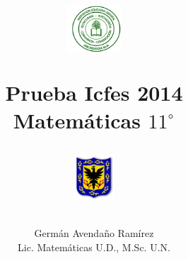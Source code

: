 \documentclass[10pt,addpoints]{exam}
\begin{document}
\title{\begin{minipage}{.2\textwidth}
        \includegraphics[height=1.75cm]{Images/logo-colegio.png}
       \end{minipage}
\begin{minipage}{.55\textwidth}
 \begin{center}
Prueba Icfes 2014\\Matemáticas $11^{\circ}$
\end{center}
\end{minipage}
\begin{minipage}{.2\textwidth}
\includegraphics[height=1.75cm]{Images/logo-sed.png} 
\end{minipage}
}
\author{Germ\'{a}n Avendaño Ram\'{i}rez\\Lic. Matemáticas U.D., M.Sc. U.N.}
\date{}
\maketitle
\begin{center}
\end{center}
\vspace{0.1in}
\end{document}
